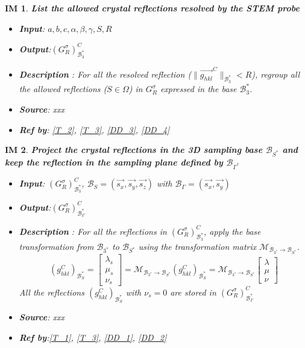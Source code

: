 \documentclass[12pt]{article}
\newcommand\norm[1]{\lVert#1\rVert}
\newtheorem{IM}{IM}
\begin{document}
\renewcommand{\labelitemi}{$-$}

\begin{IM}
\label{IM_1}
\noindent\colorbox{shadecolorIM}{\normalfont \textbf{List the allowed crystal reflections resolved by the STEM probe}}
\normalfont
\begin{itemize}
\item \textbf{Input}: $a, b, c, \alpha, \beta, \gamma, S, R$
\item \textbf{Output}:$(G^{\sigma}_{R})^{C}_{\mathcal{B}_{3}^{*}}$
\item \textbf{Description} : For all the resolved reflection ($\norm{\overrightarrow{g_{hkl}}^{C}}_{\mathcal{B}_{3}^{*}} < R$), regroup all the allowed reflections ($S \in \Omega$) in $G^{\sigma}_{R}$ expressed in the base $\mathcal{B}_{3}^{*}$.
\item \textbf{Source}: xxx
\item \textbf{Ref by}: \cref{T_2}, \cref{T_3}, \cref{DD_3}, \cref{DD_4}
\end{itemize}
\end{IM}

\begin{IM}
\label{IM_2}
\noindent\colorbox{shadecolorIM}{\normalfont \textbf{Project the crystal reflections in the 3D sampling base $\mathcal{B}_{{S}^{*}}$ and keep the reflection in the sampling plane defined by  $\mathcal{B}_{{\Gamma}^{*}}$}}
\normalfont
\begin{itemize}
\item \textbf{Input}: $(G^{\sigma}_{R})^{C}_{\mathcal{B}_{3}^{*}}$,  $\mathcal{B}_{S}=(\vec{s_x}, \vec{s_y}, \vec{s_z})$ with $\mathcal{B}_{\Gamma}=(\vec{s_x}, \vec{s_y})$
\item \textbf{Output}:$(G^{\sigma}_{R})^{C}_{\mathcal{B}_{\Gamma}^{*}}$
\item \textbf{Description} : For all the reflections in $(G^{\sigma}_{R})^{C}_{\mathcal{B}_{3}^{*}}$, apply the base transformation from $\mathcal{B}_{{3}^{*}}$ to $\mathcal{B}_{{S}^{*}}$ using the transformation matrix $\mathcal{M}_{\mathcal{B}_{{3}^{*}}\rightarrow \mathcal{B}_{{S}^{*}}}$. 
\begin{equation}
(g_{hkl}^{C})_{\mathcal{B}_{S}^{*}} = \begin{bmatrix}
\lambda_s \\
\mu_s \\
\nu_s 
\end{bmatrix} =  \mathcal{M}_{\mathcal{B}_{{3}^{*}}\rightarrow \mathcal{B}_{{S}^{*}}} 
(g_{hkl}^{C})_{\mathcal{B}_{S}^{*}} =  \mathcal{M}_{\mathcal{B}_{{3}^{*}}\rightarrow \mathcal{B}_{{S}^{*}}} \begin{bmatrix}
\lambda \\
\mu \\
\nu 
\end{bmatrix}
\end{equation}
All the reflections $(g_{hkl}^{C})_{\mathcal{B}_{S}^{*}}$ with $\nu_s=0$ are stored in  $(G^{\sigma}_{R})^{C}_{\mathcal{B}_{\Gamma}^{*}}$
\item \textbf{Source}: xxx
\item \textbf{Ref by}:\cref{T_1}, \cref{T_3}, \cref{DD_1}, \cref{DD_2}
\end{itemize}
\end{IM}
\end{document}
